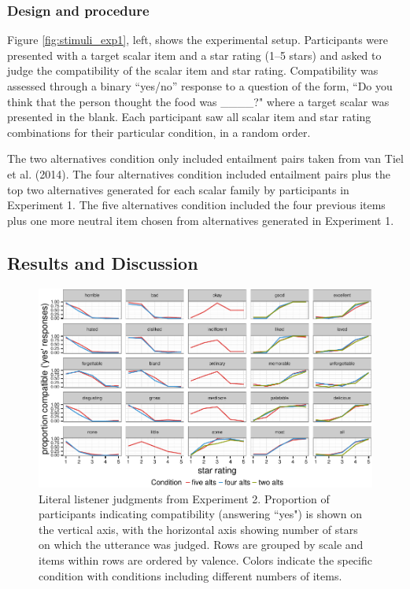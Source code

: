 \documentclass[10pt, letterpaper]{article}
\newenvironment{CodeChunk}{}{}
\begin{document}
\subsubsection{Design and procedure}\label{design-and-procedure-1}

Figure \ref{fig:stimuli_exp1}, left, shows the experimental setup.
Participants were presented with a target scalar item and a star rating
(1--5 stars) and asked to judge the compatibility of the scalar item and
star rating. Compatibility was assessed through a binary ``yes/no''
response to a question of the form, ``Do you think that the person
thought the food was \_\_\_\_?" where a target scalar was presented in
the blank. Each participant saw all scalar item and star rating
combinations for their particular condition, in a random order.

The two alternatives condition only included entailment pairs taken from
{van Tiel} et al. (2014). The four alternatives condition included
entailment pairs plus the top two alternatives generated for each scalar
family by participants in Experiment 1. The five alternatives condition
included the four previous items plus one more neutral item chosen from
alternatives generated in Experiment 1.

\subsection{Results and Discussion}\label{results-and-discussion-1}

\begin{CodeChunk}
\begin{figure}[t]

{\centering \includegraphics{figs/exp1Plots-1} 

}

\caption[Literal listener judgments from Experiment 2]{Literal listener judgments from Experiment 2. Proportion of participants indicating compatibility (answering ``yes") is shown on the vertical axis, with the horizontal axis showing number of stars on which the utterance was judged. Rows are grouped by scale and items within rows are ordered by valence. Colors indicate the specific condition with conditions including different numbers of items.}\label{fig:exp1Plots}
\end{figure}
\end{CodeChunk}
\end{document}
